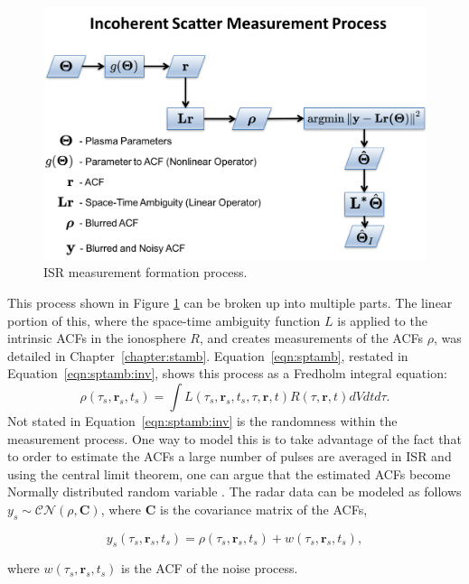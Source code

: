 \begin{figure}[!ht]
\centering
\includegraphics[width=.8\textwidth]{ladj}
\caption{ISR measurement formation process.}
\label{fig:flow1}
\end{figure}

This process shown in Figure \ref{fig:flow1} can be broken up into multiple parts. The linear portion of this, where the space-time ambiguity function $L$ is applied to the intrinsic ACFs in the ionosphere $R$, and creates measurements of the ACFs $\rho$, was detailed in Chapter~\ref{chapter:stamb}. Equation~\ref{eqn:sptamb}, restated in Equation~\ref{eqn:sptamb:inv}, shows this process as a Fredholm integral equation:
\begin{equation}
\label{eqn:sptamb:inv}
	\rho(\tau_s,\mathbf{r}_s,t_s) =\int L(\tau_s,\mathbf{r}_s,t_s,\tau,\mathbf{r},t)R(\tau,\mathbf{r},t)dVdtd\tau.
\end{equation}
Not stated in Equation~\ref{eqn:sptamb:inv} is the randomness within the measurement process. One way to model this is to take advantage of the fact that to order to estimate the ACFs a large number of pulses are averaged in ISR and using the central limit theorem, one can argue that the estimated ACFs become Normally distributed random variable \citep{papoulis2002}. The radar data can be modeled as follows $ y_s\sim \mathcal{CN}(\rho,\mathbf{C})$, where $\mathbf{C}$ is the covariance matrix of the ACFs,

\begin{equation}
\label{eqn:procsignal}
 y_s(\tau_s,\mathbf{r}_s,t_s) = \rho(\tau_s,\mathbf{r}_s,t_s) + w(\tau_s,\mathbf{r}_s,t_s),
\end{equation}

\noindent where $w(\tau_s,\mathbf{r}_s,t_s)$ is the ACF of the noise process. 


